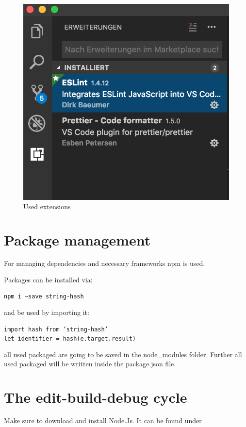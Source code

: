 \begin{figure}[H]
	\centering
	\includegraphics[scale=0.5]{bilder/cyto/LINT.png}
	\caption{Used extensions}
	\label{fig:Extensions}
\end{figure}

\section{Package management}
For managing dependencies and necessary frameworks npm is used. 

Packages can be installed via:

	\texttt{npm i ---save string-hash}

and be used by importing it:

	\texttt{import hash from 'string-hash'} \\
	\texttt{let identifier = hash(e.target.result)}

all used packaged are going to be saved in the node\_modules
folder. Further all used packaged will be written inside the
package.json file.


\section{The edit-build-debug cycle}

Make sure to download and install Node.Js. It can be found under

